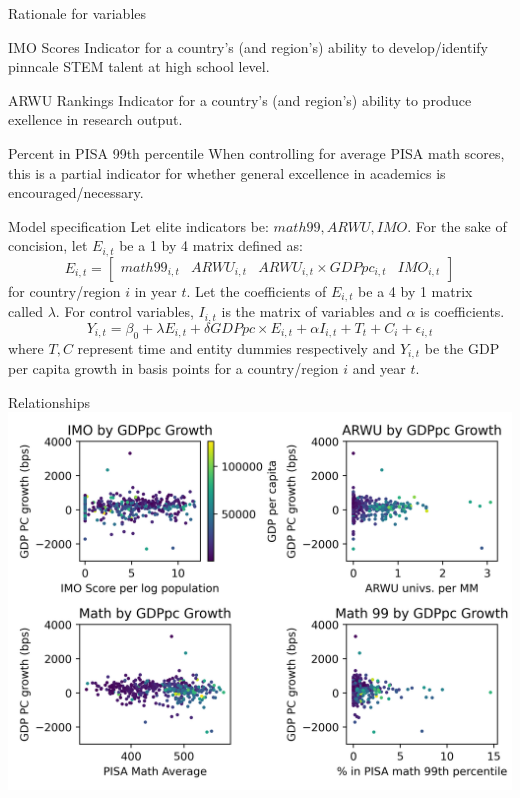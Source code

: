 \documentclass[10pt]{beamer}
\begin{document}
\begin{frame}{Rationale for variables}
    \begin{block}{IMO Scores}
        Indicator for a country's (and region's) ability to develop/identify pinncale STEM talent at high school level.
    \end{block}

    \begin{block}{ARWU Rankings}
        Indicator for a country's (and region's) ability to produce exellence in research output.
    \end{block}

    \begin{block}{Percent in PISA 99th percentile}
        When controlling for average PISA math scores, this is a partial indicator for whether general excellence in academics is encouraged/necessary.
    \end{block}
\end{frame}

\begin{frame}{Model specification}
    Let elite indicators be: $math99, ARWU, IMO$.
    For the sake of concision, let $E_{i,t}$ be a 1 by 4 matrix defined as:
    \[E_{i,t} = 
    \begin{bmatrix}
        math99_{i, t} & ARWU_{i, t} & ARWU_{i, t} \times GDPpc_{i, t} & IMO_{i, t}
    \end{bmatrix}
    \] for country/region $i$ in year $t$.
    Let the coefficients of $E_{i, t}$ be a 4 by 1 matrix called $\lambda$. For control variables, $I_{i, t}$ is the matrix of variables and $\alpha$ is coefficients.
    \begin{equation}
        Y_{i, t} = \beta_0 + \lambda E_{i, t} + \delta GDPpc \times E_{i,t} + \alpha I_{i, t} + T_t + C_i + \epsilon_{i, t}
    \end{equation}
    where $T,C$ represent time and entity dummies respectively and $Y_{i,t}$ be the GDP per capita growth in basis points for a country/region $i$ and year $t$.
\end{frame}

\begin{frame}{Relationships}
    \centering
    \includegraphics[width=\textwidth]{../charts/relationships.png}
\end{frame}
\end{document}

